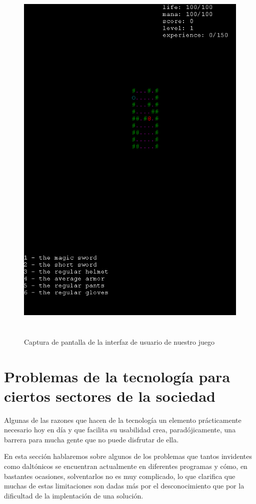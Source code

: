 \begin{figure}[H]
		\includegraphics[width=140mm, height=185mm]{./img/roomsGameGeneral.png}
	\caption{Captura de pantalla de la interfaz de usuario de nuestro juego}
	\label{fig:roomsgamegeneral}
\end{figure}

\section{Problemas de la tecnología para ciertos sectores de la sociedad}
\label{sec:dificultadesfeedback}

Algunas de las razones que hacen de la tecnología un elemento prácticamente necesario hoy en día y que facilita su usabilidad crea, paradójicamente, una barrera para mucha gente que no puede disfrutar de ella.

En esta sección hablaremos sobre algunos de los problemas que tantos invidentes como daltónicos se encuentran actualmente en diferentes programas y cómo, en bastantes ocasiones, solventarlos no es muy complicado, lo que clarifica que muchas de estas limitaciones son dadas más por el desconocimiento que por la dificultad de la implentación de una solución.

